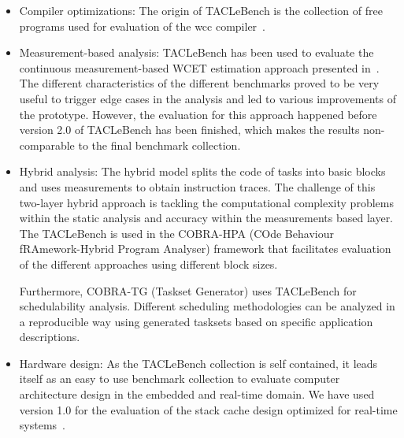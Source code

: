 \documentclass[a4paper,UKenglish]{oasics-v2016}
\newcommand{\todo}[1]{{\emph{TODO: #1}}}
\newcommand{\martin}[1]{{\color{blue} Martin: #1}}
\renewcommand{\todo}[1]{}
\renewcommand{\martin}[1]{}
\begin{document}
\begin{itemize}
\item Compiler optimizations: The origin of TACLeBench is the collection of free
programs used for evaluation of the wcc compiler~\cite{falk:wcc:wcet06}.
\item Measurement-based analysis: TACLeBench has been used to evaluate the continuous measurement-based WCET estimation approach presented
in~\cite{Dreyer2016}.
The different characteristics of the different benchmarks proved to be very useful to trigger edge cases in the analysis and led to various improvements of the prototype.
However, the evaluation for this approach happened before version 2.0 of TACLeBench has been finished,
which makes the results non-comparable to the final benchmark collection.
\martin{I am having a hard time understanding the (original) text on hybrid analysis.
What are the two layers? 
Anyway I try to rewrite and cutdown. We need to discuss this for the final version.}
\item Hybrid analysis: The hybrid model splits the code of tasks into basic blocks
and uses measurements to obtain instruction traces.
The  challenge  of  this  two-layer  hybrid  approach  is  tackling the computational complexity problems within the static analysis and accuracy  within  the  measurements based  layer.
The TACLeBench is used in the COBRA-HPA (COde Behaviour fRAmework-Hybrid Program Analyser) framework that facilitates evaluation of the different approaches using different block sizes.
\martin{We need a link or paper for the above. I did not find anything just with Google.}
Furthermore, COBRA-TG (Taskset Generator) uses TACLeBench for schedulability analysis.
Different scheduling methodologies can be analyzed in a reproducible way using generated
tasksets based on specific application descriptions.
\item Hardware design: As the TACLeBench collection is self contained, it leads itself
as an easy to use benchmark collection to evaluate computer architecture design in the
embedded and real-time domain. We have used version 1.0 for the evaluation of the
stack cache design optimized for real-time systems~\cite{patmos:stackcache:rts}.


\end{itemize}
\end{document}
